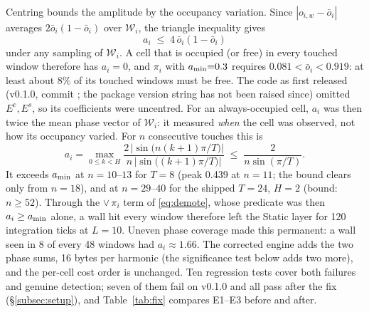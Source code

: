 \begin{remark}\label{rem:leak}
Centring bounds the amplitude by the occupancy variation. Since $|o_{i,w}-\bar{o}_i|$ averages $2\bar{o}_i(1-\bar{o}_i)$ over $\mathcal{W}_i$, the triangle inequality gives
\[
  a_i\;\le\;4\,\bar{o}_i(1-\bar{o}_i)
\]
under any sampling of $\mathcal{W}_i$. A cell that is occupied (or free) in every touched window therefore has $a_i=0$, and $\pi_i$ with $a_{\min}{=}0.3$ requires $0.081<\bar{o}_i<0.919$: at least about 8\% of its touched windows must be free. The code as first released (v0.1.0, commit ; the package version string has not been raised since) omitted $E^{c},E^{s}$, so its coefficients were uncentred. For an always-occupied cell, $a_i$ was then twice the mean phase vector of $\mathcal{W}_i$: it measured \emph{when} the cell was observed, not how its occupancy varied. For $n$ consecutive touches this is
\[
  a_i=\max_{0\le k<H}\frac{2\,\big|\sin\big(n(k{+}1)\pi/T\big)\big|}{n\,\big|\sin\big((k{+}1)\pi/T\big)\big|}\;\le\;\frac{2}{n\sin(\pi/T)}.
\]
It exceeds $a_{\min}$ at $n=10$--$13$ for $T{=}8$ (peak 0.439 at $n{=}11$; the bound clears only from $n{=}18$), and at $n=29$--$40$ for the shipped $T{=}24$, $H{=}2$ (bound: $n\ge52$). Through the $\lor\,\pi_i$ term of \eqref{eq:demote}, whose predicate was then $a_i\ge a_{\min}$ alone, a wall hit every window therefore left the Static layer for 120 integration ticks at $L{=}10$. Uneven phase coverage made this permanent: a wall seen in 8 of every 48 windows had $a_i\approx1.66$. The corrected engine adds the two phase sums, 16 bytes per harmonic (the significance test below adds two more), and the per-cell cost order is unchanged. Ten regression tests cover both failures and genuine detection; seven of them fail on v0.1.0 and all pass after the fix (\S\ref{subsec:setup}), and Table~\ref{tab:fix} compares E1--E3 before and after.
\end{remark}

